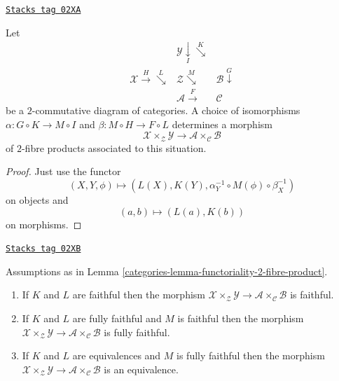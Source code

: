 \begin{lemma}
\label{categories-lemma-functoriality-2-fibre-product}
\href{https://stacks.math.columbia.edu/tag/02XA}{\texttt{Stacks tag 02XA}}

Let
$$
\begin{array}{ccc} & \mathcal{Y} \underset{I}{\downarrow}\overset{K}{\searrow} &  \\ \mathcal{X} \overset{H}{\longrightarrow}\overset{L}{\searrow} & \mathcal{Z} \overset{M}{\searrow} & \mathcal{B} \overset{G}{\downarrow} \\  & \mathcal{A} \overset{F}{\longrightarrow} & \mathcal{C}\end{array}
$$
be a $2$-commutative diagram of categories.
A choice of isomorphisms
$\alpha : G \circ K \to M \circ I$ and
$\beta : M \circ H \to F \circ L$
determines a morphism
$$
\mathcal{X} \times_\mathcal{Z} \mathcal{Y}
\longrightarrow
\mathcal{A} \times_\mathcal{C} \mathcal{B}
$$
of $2$-fibre products associated to this situation.
\end{lemma}

\begin{proof}
Just use the functor
$$
(X, Y, \phi) \longmapsto (L(X), K(Y),
\alpha^{-1}_Y \circ M(\phi) \circ \beta^{-1}_X)
$$
on objects and
$$
(a, b) \longmapsto (L(a), K(b))
$$
on morphisms.
\end{proof}

\begin{lemma}
\label{categories-lemma-equivalence-2-fibre-product}
\href{https://stacks.math.columbia.edu/tag/02XB}{\texttt{Stacks tag 02XB}}

Assumptions as in Lemma \ref{categories-lemma-functoriality-2-fibre-product}.
\begin{enumerate}
\item If $K$ and $L$ are faithful
then the morphism
$\mathcal{X} \times_\mathcal{Z} \mathcal{Y} \to
\mathcal{A} \times_\mathcal{C} \mathcal{B}$
is faithful.
\item If $K$ and $L$ are fully faithful and $M$ is faithful
then the morphism
$\mathcal{X} \times_\mathcal{Z} \mathcal{Y} \to
\mathcal{A} \times_\mathcal{C} \mathcal{B}$
is fully faithful.
\item If $K$ and $L$ are equivalences and $M$ is fully faithful
then the morphism
$\mathcal{X} \times_\mathcal{Z} \mathcal{Y} \to
\mathcal{A} \times_\mathcal{C} \mathcal{B}$
is an equivalence.
\end{enumerate}
\end{lemma}

